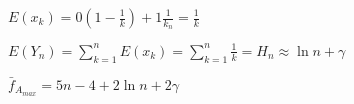 \documentclass[12pt]{report}
\begin{document}
\begin{enumerate}
		$E(x_k)=0(1-\frac{1}{k}) + 1\frac{1}{k_n}=\frac{1}{k}$\par
		$E(Y_n)=\sum_{k=1}^n E(x_k)=\sum_{k=1}^n \frac{1}{k}=H_n \approx \ln n + \gamma$\par
		$\bar{f}_{A_{max}} = 5n-4+2\ln n+2\gamma$
	\end{enumerate}
\end{document}
